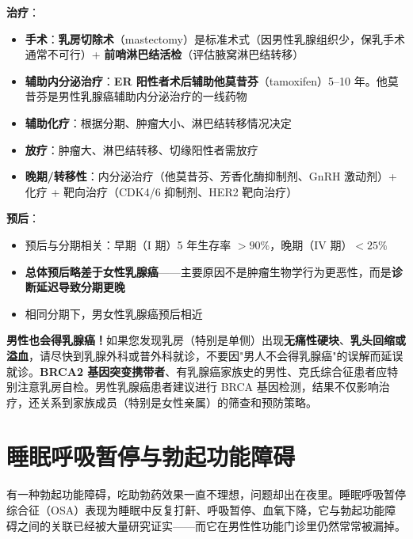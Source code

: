 \vspace{0.5em}
\noindent\textbf{治疗}：

\begin{itemize}[leftmargin=2cm]
	\item \textbf{手术}：\textbf{乳房切除术}（mastectomy）是标准术式（因男性乳腺组织少，保乳手术通常不可行）+ \textbf{前哨淋巴结活检}（评估腋窝淋巴结转移）
	\item \textbf{辅助内分泌治疗}：\textbf{ER 阳性者术后辅助他莫昔芬}（tamoxifen）5--10 年。他莫昔芬是男性乳腺癌辅助内分泌治疗的一线药物
	\item \textbf{辅助化疗}：根据分期、肿瘤大小、淋巴结转移情况决定
	\item \textbf{放疗}：肿瘤大、淋巴结转移、切缘阳性者需放疗
	\item \textbf{晚期/转移性}：内分泌治疗（他莫昔芬、芳香化酶抑制剂、GnRH 激动剂）+ 化疗 + 靶向治疗（CDK4/6 抑制剂、HER2 靶向治疗）
\end{itemize}

\vspace{0.5em}
\noindent\textbf{预后}：

\begin{itemize}[leftmargin=2cm]
	\item 预后与分期相关：早期（I 期）5 年生存率 $>90\%$，晚期（IV 期）$<25\%$
	\item \textbf{总体预后略差于女性乳腺癌}——主要原因不是肿瘤生物学行为更恶性，而是\textbf{诊断延迟导致分期更晚}
	\item 相同分期下，男女性乳腺癌预后相近
\end{itemize}

\begin{tcolorbox}[colback=pink!5!white,colframe=red!50!black,title=贴心小叮咛]
\textbf{男性也会得乳腺癌！}如果您发现乳房（特别是单侧）出现\textbf{无痛性硬块}、\textbf{乳头回缩或溢血}，请尽快到乳腺外科或普外科就诊，不要因"男人不会得乳腺癌"的误解而延误就诊。\textbf{BRCA2 基因突变携带者}、有乳腺癌家族史的男性、克氏综合征患者应特别注意乳房自检。男性乳腺癌患者建议进行 BRCA 基因检测，结果不仅影响治疗，还关系到家族成员（特别是女性亲属）的筛查和预防策略。
\end{tcolorbox}


\section{睡眠呼吸暂停与勃起功能障碍}

有一种勃起功能障碍，吃助勃药效果一直不理想，问题却出在夜里。睡眠呼吸暂停综合征（OSA）表现为睡眠中反复打鼾、呼吸暂停、血氧下降，它与勃起功能障碍之间的关联已经被大量研究证实——而它在男性性功能门诊里仍然常常被漏掉。

